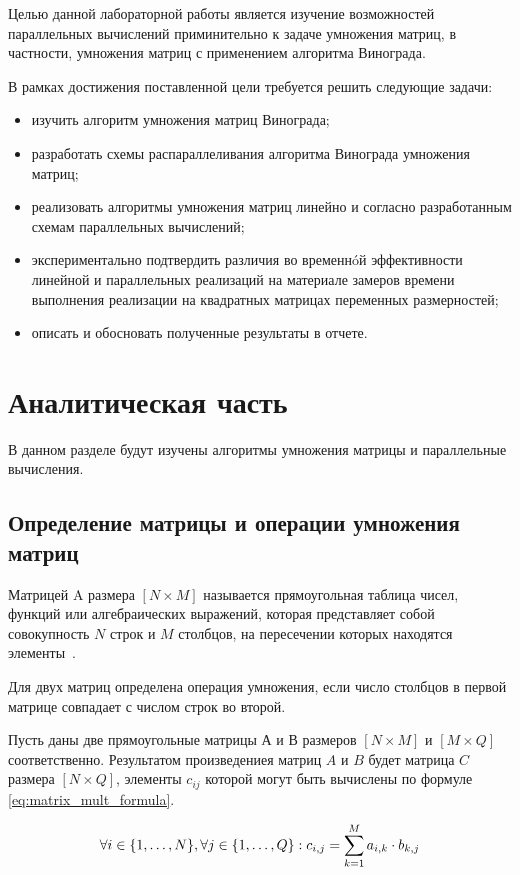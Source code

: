 \documentclass[12pt]{report}
\begin{document}
Целью данной лабораторной работы является изучение возможностей параллельных вычислений приминительно к задаче умножения матриц, в частности, умножения матриц с применением алгоритма Винограда.

В рамках достижения поставленной цели требуется решить следующие задачи: 
\begin{itemize}
	\item изучить алгоритм умножения матриц Винограда;
	\item разработать схемы распараллеливания алгоритма Винограда умножения матриц; 
	\item реализовать алгоритмы умножения матриц линейно и согласно разработанным схемам параллельных вычислений;
	\item экспериментально подтвердить различия во временнóй эффективности линейной и параллельных реализаций на материале замеров времени выполнения реализации на квадратных матрицах переменных размерностей;
	\item описать и обосновать полученные результаты в отчете.
\end{itemize}

\chapter{Аналитическая часть}

В данном разделе будут изучены алгоритмы умножения матрицы и параллельные вычисления.

\section{Определение матрицы и операции умножения матриц}

Матрицей A размера $[N \times M]$ называется прямоугольная таблица чисел, функций или алгебраических выражений, которая представляет собой совокупность $N$ строк и $M$ столбцов, на пересечении которых находятся элементы~\cite{matr}.

Для двух матриц определена операция умножения, если число столбцов в первой матрице совпадает с числом строк во второй.

Пусть даны две прямоугольные матрицы А и В размеров $[N \times M]$ и $[M \times Q]$ соответственно. Результатом произведениея матриц $A$ и $B$ будет матрица $C$ размера $[N \times Q]$, элементы $c_{ij}$ которой могут быть вычислены \cite{matr} по формуле \ref{eq:matrix_mult_formula}.

\begin{equation}
	\label{eq:matrix_mult_formula}
	\forall{i \in \{1,\dotsc,N\}}, \forall{j\in \{1,\dotsc,Q\}}: \\
	c_{i,j} = \sum\limits_{k=1}^M a_{i,k}\cdot b_{k,j}
\end{equation}
\end{document}
